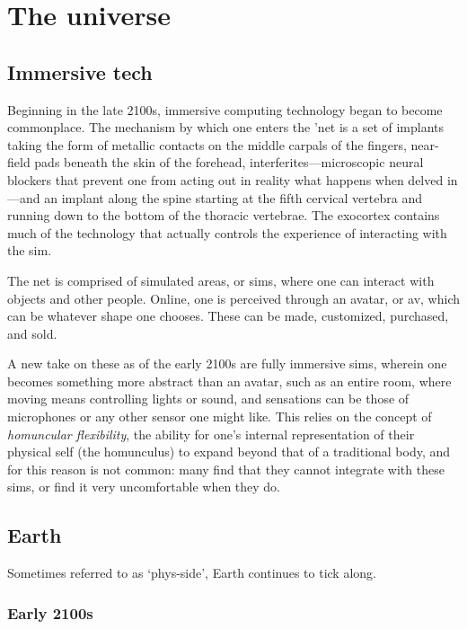 \section*{The universe}

\subsection{Immersive tech}

Beginning in the late 2100s, immersive computing technology began to become commonplace. The mechanism by which one enters the 'net is a set of implants taking the form of metallic contacts on the middle carpals of the fingers, near-field pads beneath the skin of the forehead, interferites---microscopic neural blockers that prevent one from acting out in reality what happens when delved in---and an implant along the spine starting at the fifth cervical vertebra and running down to the bottom of the thoracic vertebrae. The exocortex contains much of the technology that actually controls the experience of interacting with the sim.

The net is comprised of simulated areas, or sims, where one can interact with objects and other people. Online, one is perceived through an avatar, or av, which can be whatever shape one chooses. These can be made, customized, purchased, and sold.

A new take on these as of the early 2100s are fully immersive sims, wherein one becomes something more abstract than an avatar, such as an entire room, where moving means controlling lights or sound, and sensations can be those of microphones or any other sensor one might like. This relies on the concept of \emph{homuncular flexibility}, the ability for one's internal representation of their physical self (the homunculus) to expand beyond that of a traditional body, and for this reason is not common: many find that they cannot integrate with these sims, or find it very uncomfortable when they do.

\vspace{-0.5em}

\subsection{Earth}

Sometimes referred to as `phys-side', Earth continues to tick along.

\vspace{-0.5em}

\subsubsection{Early 2100s}

